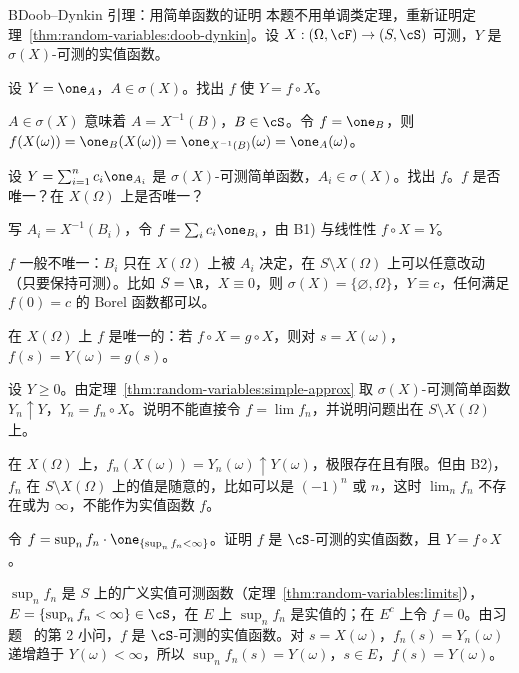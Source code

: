 \begin{probleme}{B}{Doob--Dynkin 引理：用简单函数的证明}
本题不用单调类定理，重新证明定理~\ref{thm:random-variables:doob-dynkin}。设 $X:(\Omega,\cF)\to(S,\cS)$ 可测，$Y$ 是 $\sigma(X)$-可测的实值函数。
\begin{questions}
\item 设 $Y=\one_A$，$A\in\sigma(X)$。找出 $f$ 使 $Y=f\circ X$。
\begin{solution}
$A\in\sigma(X)$ 意味着 $A=X^{-1}(B)$，$B\in\cS$。令 $f=\one_B$，则 $f(X(\omega))=\one_B(X(\omega))=\one_{X^{-1}(B)}(\omega)=\one_A(\omega)$。
\end{solution}
\item 设 $Y=\sum_{i=1}^nc_i\one_{A_i}$ 是 $\sigma(X)$-可测简单函数，$A_i\in\sigma(X)$。找出 $f$。$f$ 是否唯一？在 $X(\Omega)$ 上是否唯一？
\begin{solution}
写 $A_i=X^{-1}(B_i)$，令 $f=\sum_ic_i\one_{B_i}$，由 B1) 与线性性 $f\circ X=Y$。

$f$ 一般不唯一：$B_i$ 只在 $X(\Omega)$ 上被 $A_i$ 决定，在 $S\setminus X(\Omega)$ 上可以任意改动（只要保持可测）。比如 $S=\R$，$X\equiv0$，则 $\sigma(X)=\{\varnothing,\Omega\}$，$Y\equiv c$，任何满足 $f(0)=c$ 的 Borel 函数都可以。

在 $X(\Omega)$ 上 $f$ 是唯一的：若 $f\circ X=g\circ X$，则对 $s=X(\omega)$，$f(s)=Y(\omega)=g(s)$。
\end{solution}
\item 设 $Y\geqslant0$。由定理~\ref{thm:random-variables:simple-approx} 取 $\sigma(X)$-可测简单函数 $Y_n\uparrow Y$，$Y_n=f_n\circ X$。说明不能直接令 $f=\lim f_n$，并说明问题出在 $S\setminus X(\Omega)$ 上。
\begin{solution}
在 $X(\Omega)$ 上，$f_n(X(\omega))=Y_n(\omega)\uparrow Y(\omega)$，极限存在且有限。但由 B2)，$f_n$ 在 $S\setminus X(\Omega)$ 上的值是随意的，比如可以是 $(-1)^n$ 或 $n$，这时 $\lim_nf_n$ 不存在或为 $\infty$，不能作为实值函数 $f$。
\end{solution}
\item 令 $f=\sup_nf_n\cdot\one_{\{\sup_nf_n<\infty\}}$。证明 $f$ 是 $\cS$-可测的实值函数，且 $Y=f\circ X$。
\begin{solution}
$\sup_nf_n$ 是 $S$ 上的广义实值可测函数（定理~\ref{thm:random-variables:limits}），$E=\{\sup_nf_n<\infty\}\in\cS$，在 $E$ 上 $\sup_nf_n$ 是实值的；在 $E^c$ 上令 $f=0$。由习题~ 的第 2 小问，$f$ 是 $\cS$-可测的实值函数。对 $s=X(\omega)$，$f_n(s)=Y_n(\omega)$ 递增趋于 $Y(\omega)<\infty$，所以 $\sup_nf_n(s)=Y(\omega)$，$s\in E$，$f(s)=Y(\omega)$。


\end{solution}
\end{questions}
\end{probleme}
